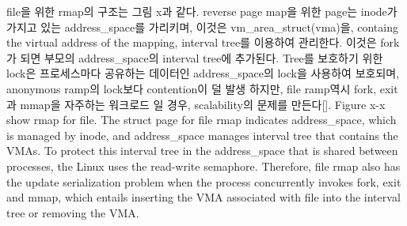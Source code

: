 \ifkor
file을 위한 rmap의 구조는 그림 x과 같다. 
reverse page map을 위한 page는 inode가 가지고 있는 address\_space를 가리키며, 이것은
vm\_area\_struct(vma)을, containg the virtual address of the mapping, interval
tree를 이용하여 관리한다. 이것은 fork가 되면 부모의 address\_space의 interval tree에 추가된다.
Tree를 보호하기 위한 lock은 프로세스마다 공유하는 데이터인 address\_space의 lock을 사용하여
보호되며, anonymous ramp의 lock보다 contention이 덜 발생 하지만, file ramp역시 fork, exit과
mmap을 자주하는 워크로드 일 경우, scalability의 문제를 만든다[]. 
\else
Figure x-x show rmap for file.
The struct page for file rmap indicates address\_space, which is
managed by inode, and address\_space manages interval tree that contains the
VMAs.
To protect this interval tree in the address\_space that is shared between
processes, the Linux uses the read-write semaphore.
Therefore, file rmap also has the update serialization problem when
the process concurrently invokes fork, exit and mmap, which entails inserting the VMA
associated with file into the interval tree or removing the VMA.
\fi



